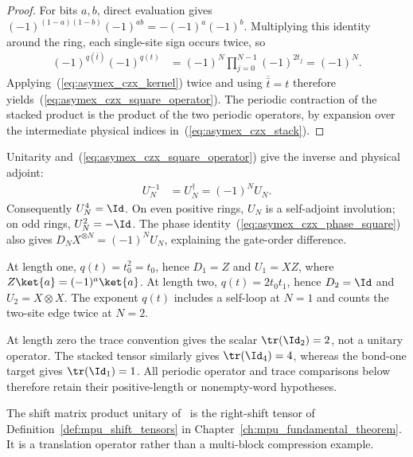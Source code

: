 \begin{proof}
    \leanok
    For bits $a,b$, direct evaluation gives
    $(-1)^{(1-a)(1-b)}(-1)^{ab}
        =-(-1)^a(-1)^b$. Multiplying this identity around the ring,
    each single-site sign occurs twice, so
    \begin{align}
        (-1)^{q(\bar t)}(-1)^{q(t)}
         & =(-1)^N\prod_{j=0}^{N-1}(-1)^{2t_j}=(-1)^N.
        \label{eq:asymex_czx_phase_square}
    \end{align}
    Applying~(\ref{eq:asymex_czx_kernel}) twice and using
    $\overline{\bar t}=t$ therefore
    yields~(\ref{eq:asymex_czx_square_operator}).
    The periodic contraction of the stacked product is the product
    of the two periodic operators, by expansion over the intermediate
    physical indices in~(\ref{eq:asymex_czx_stack}).
\end{proof}

Unitarity and~(\ref{eq:asymex_czx_square_operator}) give the inverse
and physical adjoint:
\begin{align}
    U_N^{-1} & =U_N^\dagger=(-1)^NU_N.
    \label{eq:asymex_czx_adjoint}
\end{align}
Consequently $U_N^4=\Id$. On even positive rings, $U_N$ is a
self-adjoint involution; on odd rings, $U_N^2=-\Id$.
The phase identity~(\ref{eq:asymex_czx_phase_square}) also gives
$D_NX^{\otimes N}=(-1)^NU_N$, explaining the gate-order difference.

At length one, $q(t)=t_0^2=t_0$, hence $D_1=Z$ and $U_1=XZ$,
where $Z\ket{a}=(-1)^a\ket{a}$. At length two,
$q(t)=2t_0t_1$, hence $D_2=\Id$ and $U_2=X\otimes X$.
The exponent $q(t)$ includes a self-loop at $N=1$ and counts the two-site edge
twice at $N=2$.

At length zero the trace convention gives the scalar
$\tr(\Id_2)=2$, not a unitary operator. The stacked tensor similarly
gives $\tr(\Id_4)=4$, whereas the bond-one target gives
$\tr(\Id_1)=1$. All periodic operator and trace comparisons below
therefore retain their positive-length or nonempty-word hypotheses.

\begin{remark}
    The shift matrix product unitary
    of~\cite[Appendix~A, ``The shift MPU'']{Cirac2021Matrix} is the
    right-shift tensor of Definition~\ref{def:mpu_shift_tensors} in
    Chapter~\ref{ch:mpu_fundamental_theorem}. It is a translation operator rather than a
    multi-block compression example.
\end{remark}

